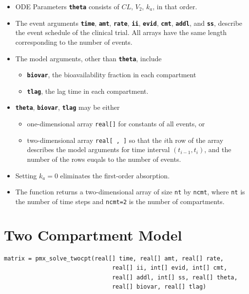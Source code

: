 \documentclass[11pt, reqno, oneside]{amsbook}
\numberwithin{equation}{chapter}
\numberwithin{figure}{chapter}
\numberwithin{table}{chapter}
\theoremstyle{remark}
\begin{document}
\begin{itemize}
\item ODE Parameters {\small \color{MRGGreen} \texttt{\textbf{theta}}} consists of \(CL\), \(V_2\), \(k_a\), in that order.
\item The event arguments {\small \color{MRGGreen} \texttt{\textbf{time}}}, {\small \color{MRGGreen} \texttt{\textbf{amt}}}, {\small \color{MRGGreen} \texttt{\textbf{rate}}}, {\small \color{MRGGreen} \texttt{\textbf{ii}}}, {\small \color{MRGGreen} \texttt{\textbf{evid}}}, {\small \color{MRGGreen} \texttt{\textbf{cmt}}}, {\small \color{MRGGreen} \texttt{\textbf{addl}}}, and
{\small \color{MRGGreen} \texttt{\textbf{ss}}}, describe the event schedule of the clinical
trial. All arrays have the same length corresponding to the number of events.
\item The model arguments, other than {\small \color{MRGGreen} \texttt{\textbf{theta}}}, include
\begin{itemize}
\item {\small \color{MRGGreen} \texttt{\textbf{biovar}}}, the bioavailability fraction in each compartment
\item {\small \color{MRGGreen} \texttt{\textbf{tlag}}}, the lag time in each compartment.
\end{itemize}
\item {\small \color{MRGGreen} \texttt{\textbf{theta}}}, {\small \color{MRGGreen} \texttt{\textbf{biovar}}}, {\small \color{MRGGreen} \texttt{\textbf{tlag}}} may be either 
\begin{itemize}
\item one-dimensional array \texttt{real[]}
for constants of all events, or
\item two-dimensional array \texttt{real[ , ]}
so that the \(i\)th row of the array describes
the model arguments for time interval \((t_{i-1}, t_i)\),
and the number of the rows euqals to the number of events.
\end{itemize}
\item Setting \(k_a = 0\) eliminates the first-order absorption.
\item The function returns a two-dimensional array of size \texttt{nt}
by \texttt{ncmt}, where \texttt{nt} is the number of time steps and
\texttt{ncmt=2} is the number of compartments.
\end{itemize}

\section{Two Compartment Model}
\label{sec:orgeb4f80a}
\label{sec:twocpt}
\begin{verbatim}
matrix = pmx_solve_twocpt(real[] time, real[] amt, real[] rate,
                               real[] ii, int[] evid, int[] cmt,
                               real[] addl, int[] ss, real[] theta,
                               real[] biovar, real[] tlag)
\end{verbatim}
\end{document}
